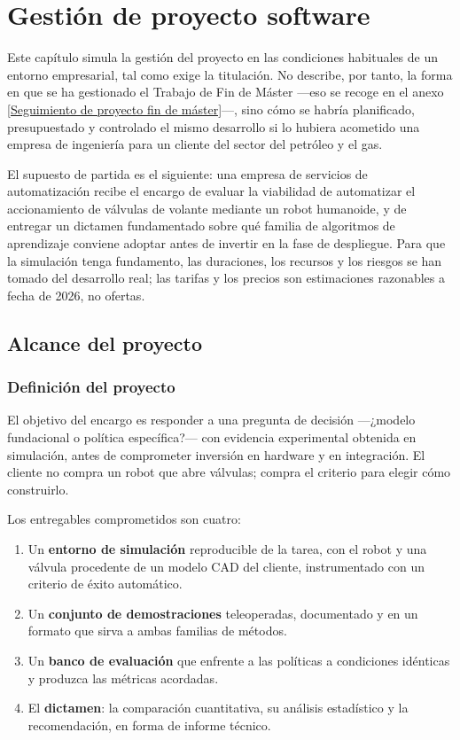 \chapter{Gestión de proyecto software}
\label{Gestión de proyecto software}

Este capítulo simula la gestión del proyecto en las condiciones habituales de un entorno
empresarial, tal como exige la titulación. No describe, por tanto, la forma en que se ha gestionado
el Trabajo de Fin de Máster —eso se recoge en el anexo
\ref{Seguimiento de proyecto fin de máster}—, sino cómo se habría planificado, presupuestado y
controlado el mismo desarrollo si lo hubiera acometido una empresa de ingeniería para un cliente
del sector del petróleo y el gas.

El supuesto de partida es el siguiente: una empresa de servicios de automatización recibe el
encargo de evaluar la viabilidad de automatizar el accionamiento de válvulas de volante mediante un
robot humanoide, y de entregar un dictamen fundamentado sobre qué familia de algoritmos de
aprendizaje conviene adoptar antes de invertir en la fase de despliegue. Para que la simulación
tenga fundamento, las duraciones, los recursos y los riesgos se han tomado del desarrollo real; las
tarifas y los precios son estimaciones razonables a fecha de 2026, no ofertas.


\section{Alcance del proyecto}
\label{Alcance del proyecto}

\subsection{Definición del proyecto}

El objetivo del encargo es responder a una pregunta de decisión —¿modelo fundacional o política
específica?— con evidencia experimental obtenida en simulación, antes de comprometer inversión en
hardware y en integración. El cliente no compra un robot que abre válvulas; compra el criterio para
elegir cómo construirlo.

Los entregables comprometidos son cuatro:

\begin{enumerate}
	\item Un \textbf{entorno de simulación} reproducible de la tarea, con el robot y una válvula
	procedente de un modelo CAD del cliente, instrumentado con un criterio de éxito automático.
	\item Un \textbf{conjunto de demostraciones} teleoperadas, documentado y en un formato que sirva
	a ambas familias de métodos.
	\item Un \textbf{banco de evaluación} que enfrente a las políticas a condiciones idénticas y
	produzca las métricas acordadas.
	\item El \textbf{dictamen}: la comparación cuantitativa, su análisis estadístico y la
	recomendación, en forma de informe técnico.
\end{enumerate}

